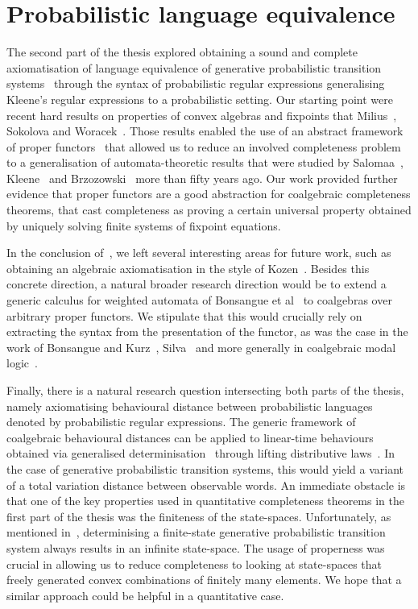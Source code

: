 \section{Probabilistic language equivalence}
The second part of the thesis explored obtaining a sound and complete axiomatisation of language equivalence of generative probabilistic transition systems~\cite{Glabbeek:1995:Reactive} through the syntax of probabilistic regular expressions generalising Kleene's regular expressions to a probabilistic setting. Our starting point were recent hard results on properties of convex algebras and fixpoints that Milius~\cite{Milius:2018:Proper}, Sokolova and Woracek~\cite{Sokolova:2015:Congruences,Sokolova:2018:Proper}. Those results enabled the use of an abstract framework of proper functors~\cite{Milius:2018:Proper} that allowed us to reduce an involved completeness problem to a generalisation of automata-theoretic results that were studied by Salomaa~\cite{Salomaa:1966:Two}, Kleene~\cite{Kleene:1951:Representation} and Brzozowski~\cite{Brzozowski:1964:Expressions} more than fifty years ago. Our work provided further evidence that proper functors are a good abstraction for coalgebraic completeness theorems, that cast completeness as proving a certain universal property obtained by uniquely solving finite systems of fixpoint equations. 

In the conclusion of~, we left several interesting areas for future work, such as obtaining an algebraic axiomatisation in the style of Kozen~\cite{Kozen:1994:Completeness}. Besides this concrete direction, a natural broader research direction would be to extend a generic calculus for weighted automata of Bonsangue et al~\cite{Bonsangue:2013:Sound} to coalgebras over arbitrary proper functors. We stipulate that this would crucially rely on extracting the syntax from the presentation of the functor, as was the case in the work of Bonsangue and Kurz~\cite{Bonsangue:2006:Presenting}, Silva~\cite{Silva:2010:Kleene} and more generally in coalgebraic modal logic~\cite{Schroder:2008:Expressivity}.

Finally, there is a natural research question intersecting both parts of the thesis, namely axiomatising behavioural distance between probabilistic languages denoted by probabilistic regular expressions. The generic framework of coalgebraic behavioural distances can be applied to linear-time behaviours obtained via generalised determinisation~\cite{Silva:2010:Generalizing} through lifting distributive laws~\cite{Baldan:2018:Coalgebraic}. In the case of generative probabilistic transition systems, this would yield a variant of a total variation distance between observable words. An immediate obstacle is that one of the key properties used in quantitative completeness theorems in the first part of the thesis was the finiteness of the state-spaces. Unfortunately, as mentioned in~, determinising a finite-state generative probabilistic transition system always results in an infinite state-space. The usage of properness was crucial in allowing us to reduce completeness to looking at state-spaces that freely generated convex combinations of finitely many elements. We hope that a similar approach could be helpful in a quantitative case.